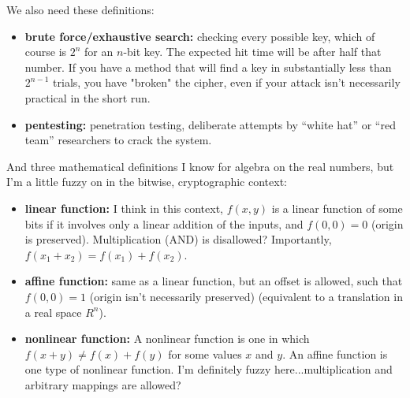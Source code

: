 We also need these definitions:

\begin{itemize}
\item {\bf brute force/exhaustive search:} checking every possible key, which of
  course is $2^n$ for an $n$-bit key.  The expected hit time will be
  after half that number.  If you have a method that will find a
  key in substantially less than $2^{n-1}$ trials, you have "broken" the
  cipher, even if your attack isn't necessarily practical in the short
  run.
\item {\bf pentesting:} penetration testing, deliberate attempts by
  ``white hat'' or ``red team'' researchers to crack the system.
\end{itemize}

\aono{}
And three mathematical definitions I know for algebra on the real
numbers, but I'm a little fuzzy on in the bitwise, cryptographic
context:

\begin{itemize}
\item {\bf linear function:} I think in this context, $f(x,y)$ is a linear
  function of some bits if it involves only a linear addition of
  the inputs, and $f(0,0) = 0$ (origin is preserved).  Multiplication
  (AND) is disallowed?  Importantly, $f(x_1 + x_2) = f(x_1) + f(x_2)$.
\item {\bf affine function:} same as a linear function, but an offset is
  allowed, such that $f(0,0) = 1$ (origin isn't necessarily preserved)
  (equivalent to a translation in a real space $R^n$).
\item {\bf nonlinear function:} A nonlinear function is one in which $f(x+y) \ne f(x) + f(y)$ for some values $x$ and $y$. An affine function is one type of nonlinear function. I'm definitely fuzzy here...multiplication and
  arbitrary mappings are allowed?
\end{itemize}

